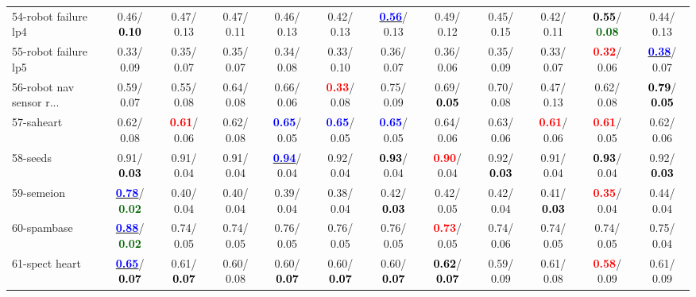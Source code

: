 \begin{table}[h]
\begin{center}
{\begin{tabular}{lc|c|c|c|c|c|c|c|c|c|c}
54-robot failure lp4 &   0.46/\textcolor{black}{\textbf{  0.10}} &   0.47/  0.13 &   0.47/  0.11 &   0.46/  0.13 &   0.42/  0.13 & \underline{\textcolor{blue}{\textbf{  0.56}}}/  0.13 &   0.49/  0.12 &   0.45/  0.15 &   0.42/  0.11 & \textcolor{black}{\textbf{  0.55}}/\textcolor{darkgreen}{\textbf{  0.08}} &   0.44/  0.13 \\
55-robot failure lp5 &   0.33/  0.09 &   0.35/  0.07 &   0.35/  0.07 &   0.34/  0.08 &   0.33/  0.10 &   0.36/  0.07 &   0.36/  0.06 &   0.35/  0.09 &   0.33/  0.07 & \textcolor{red}{\textbf{  0.32}}/  0.06 & \underline{\textcolor{blue}{\textbf{  0.38}}}/  0.07 \\
56-robot nav sensor r... &   0.59/  0.07 &   0.55/  0.08 &   0.64/  0.08 &   0.66/  0.06 & \textcolor{red}{\textbf{  0.33}}/  0.08 &   0.75/  0.09 &   0.69/\textcolor{black}{\textbf{  0.05}} &   0.70/  0.08 &   0.47/  0.13 &   0.62/  0.08 & \textcolor{black}{\textbf{  0.79}}/\textcolor{black}{\textbf{  0.05}} \\
57-saheart &   0.62/  0.08 & \textcolor{red}{\textbf{  0.61}}/  0.06 &   0.62/  0.08 & \textcolor{blue}{\textbf{  0.65}}/  0.05 & \textcolor{blue}{\textbf{  0.65}}/  0.05 & \textcolor{blue}{\textbf{  0.65}}/  0.05 &   0.64/  0.06 &   0.63/  0.06 & \textcolor{red}{\textbf{  0.61}}/  0.06 & \textcolor{red}{\textbf{  0.61}}/  0.05 &   0.62/  0.06 \\
58-seeds &   0.91/\textcolor{black}{\textbf{  0.03}} &   0.91/  0.04 &   0.91/  0.04 & \underline{\textcolor{blue}{\textbf{  0.94}}}/  0.04 &   0.92/  0.04 & \textcolor{black}{\textbf{  0.93}}/  0.04 & \textcolor{red}{\textbf{  0.90}}/  0.04 &   0.92/\textcolor{black}{\textbf{  0.03}} &   0.91/  0.04 & \textcolor{black}{\textbf{  0.93}}/  0.04 &   0.92/\textcolor{black}{\textbf{  0.03}} \\
59-semeion & \underline{\textcolor{blue}{\textbf{  0.78}}}/\textcolor{darkgreen}{\textbf{  0.02}} &   0.40/  0.04 &   0.40/  0.04 &   0.39/  0.04 &   0.38/  0.04 &   0.42/\textcolor{black}{\textbf{  0.03}} &   0.42/  0.05 &   0.42/  0.04 &   0.41/\textcolor{black}{\textbf{  0.03}} & \textcolor{red}{\textbf{  0.35}}/  0.04 &   0.44/  0.04 \\
60-spambase & \underline{\textcolor{blue}{\textbf{  0.88}}}/\textcolor{darkgreen}{\textbf{  0.02}} &   0.74/  0.05 &   0.74/  0.05 &   0.76/  0.05 &   0.76/  0.05 &   0.76/  0.05 & \textcolor{red}{\textbf{  0.73}}/  0.05 &   0.74/  0.06 &   0.74/  0.05 &   0.74/  0.05 &   0.75/  0.04 \\ \hline
61-spect heart & \underline{\textcolor{blue}{\textbf{  0.65}}}/\textcolor{black}{\textbf{  0.07}} &   0.61/\textcolor{black}{\textbf{  0.07}} &   0.60/  0.08 &   0.60/\textcolor{black}{\textbf{  0.07}} &   0.60/\textcolor{black}{\textbf{  0.07}} &   0.60/\textcolor{black}{\textbf{  0.07}} & \textcolor{black}{\textbf{  0.62}}/\textcolor{black}{\textbf{  0.07}} &   0.59/  0.09 &   0.61/  0.08 & \textcolor{red}{\textbf{  0.58}}/  0.09 &   0.61/  0.09 \\

\end{tabular}}
\end{center}
\end{table}
